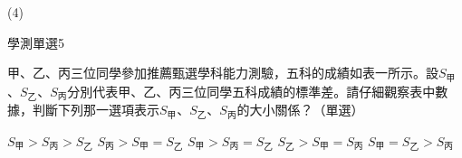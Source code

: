 \begin{QUESTIONS}
\begin{QUESTION}
\begin{QBODY}
            \begin{QOPS}
            \end{QOPS}        
        \end{QBODY}
        \begin{QFROMS}
        \end{QFROMS}
        \begin{QTAGS}\end{QTAGS}
        \begin{QANS}
            (4)
        \end{QANS}
        \begin{QSOLLIST}
        \end{QSOLLIST}
        \begin{QEMPTYSPACE}
        \end{QEMPTYSPACE}
    \end{QUESTION}
    \begin{QUESTION}
        \begin{ExamInfo}{83}{學測}{單選}{5}
        \end{ExamInfo}
        \begin{ExamAnsRateInfo}{}{}{}{}
        \end{ExamAnsRateInfo}
        \begin{QBODY}
            	甲、乙、丙三位同學參加推薦甄選學科能力測驗，五科的成績如表一所示。設${{S}_{\text{甲}}}$、${{S}_{\text{乙}}}$、${{S}_{\text{丙}}}$分別代表甲、乙、丙三位同學五科成績的標準差。請仔細觀察表中數據，判斷下列那一選項表示${{S}_{\text{甲}}}$、${{S}_{\text{乙}}}$、${{S}_{\text{丙}}}$的大小關係？（單選）
                \begin{QOPS}
                    \QOP ${{S}_{\text{甲}}}>{{S}_{\text{丙}}}>{{S}_{\text{乙}}}$	
                    \QOP ${{S}_{\text{丙}}}>{{S}_{\text{甲}}}={{S}_{\text{乙}}}$
                    \QOP ${{S}_{\text{甲}}}>{{S}_{\text{丙}}}={{S}_{\text{乙}}}$	
                    \QOP ${{S}_{\text{乙}}}>{{S}_{\text{甲}}}={{S}_{\text{丙}}}$
                    \QOP ${{S}_{\text{甲}}}={{S}_{\text{乙}}}>{{S}_{\text{丙}}}$
                \end{QOPS}        
        \end{QBODY}
        \begin{QFROMS}
        \end{QFROMS}
        \begin{QTAGS}\end{QTAGS}

\end{QUESTION}
\end{QUESTIONS}
